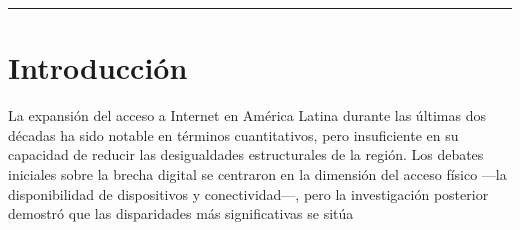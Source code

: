 \documentclass{article}
\begin{document}
\bigskip
\noindent\rule{\linewidth}{0.4pt}
\bigskip

\section{Introducción}
La expansión del acceso a Internet en América Latina durante las últimas dos décadas ha sido notable en términos cuantitativos, pero insuficiente en su capacidad de reducir las desigualdades estructurales de la región. Los debates iniciales sobre la brecha digital se centraron en la dimensión del acceso físico —la disponibilidad de dispositivos y conectividad—, pero la investigación posterior demostró que las disparidades más significativas se sitúa
\printbibliography
\end{document}
